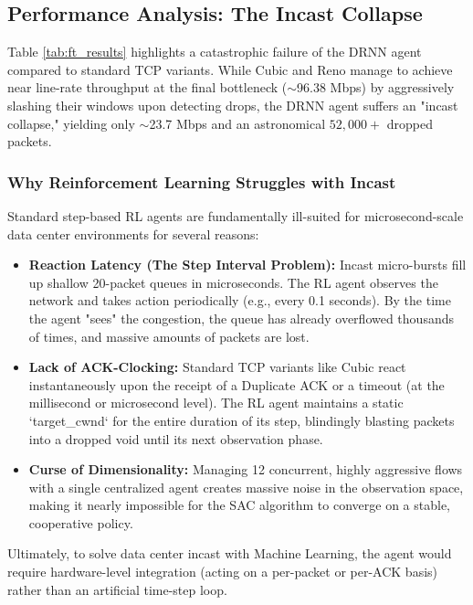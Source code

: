 \documentclass[12pt, a4paper]{article}
\begin{document}
\subsection*{Performance Analysis: The Incast Collapse}

Table \ref{tab:ft_results} highlights a catastrophic failure of the DRNN agent compared to standard TCP variants. While Cubic and Reno manage to achieve near line-rate throughput at the final bottleneck ($\sim$96.38 Mbps) by aggressively slashing their windows upon detecting drops, the DRNN agent suffers an "incast collapse," yielding only $\sim$23.7 Mbps and an astronomical $52,000+$ dropped packets.

\subsubsection*{Why Reinforcement Learning Struggles with Incast}
Standard step-based RL agents are fundamentally ill-suited for microsecond-scale data center environments for several reasons:

\begin{itemize}
    \item \textbf{Reaction Latency (The Step Interval Problem):} Incast micro-bursts fill up shallow 20-packet queues in microseconds. The RL agent observes the network and takes action periodically (e.g., every 0.1 seconds). By the time the agent "sees" the congestion, the queue has already overflowed thousands of times, and massive amounts of packets are lost.
    \item \textbf{Lack of ACK-Clocking:} Standard TCP variants like Cubic react instantaneously upon the receipt of a Duplicate ACK or a timeout (at the millisecond or microsecond level). The RL agent maintains a static `target\_cwnd` for the entire duration of its step, blindingly blasting packets into a dropped void until its next observation phase.
    \item \textbf{Curse of Dimensionality:} Managing 12 concurrent, highly aggressive flows with a single centralized agent creates massive noise in the observation space, making it nearly impossible for the SAC algorithm to converge on a stable, cooperative policy. 
\end{itemize}

Ultimately, to solve data center incast with Machine Learning, the agent would require hardware-level integration (acting on a per-packet or per-ACK basis) rather than an artificial time-step loop.
\end{document}

